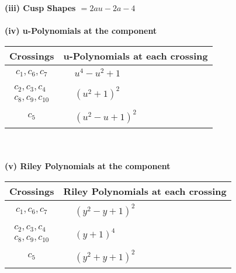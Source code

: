 \documentclass[1p]{elsarticle_modified}
\theoremstyle{definition}
\begin{document}
\flushleft \textbf{(iii) Cusp Shapes $= 2 a u-2 a-4$}\\~\\
\newpage\renewcommand{\arraystretch}{1}
\flushleft \textbf{(iv) u-Polynomials at the component}\newline \\
\begin{tabular}{m{50pt}|m{274pt}}
Crossings & \hspace{64pt}u-Polynomials at each crossing \\
\hline $$\begin{aligned}c_{1},c_{6},c_{7}\end{aligned}$$&$\begin{aligned}
&u^4- u^2+1
\end{aligned}$\\
\hline $$\begin{aligned}c_{2},c_{3},c_{4}\\c_{8},c_{9},c_{10}\end{aligned}$$&$\begin{aligned}
&(u^2+1)^2
\end{aligned}$\\
\hline $$\begin{aligned}c_{5}\end{aligned}$$&$\begin{aligned}
&(u^2- u+1)^2
\end{aligned}$\\
\hline
\end{tabular}\\~\\
\newpage\renewcommand{\arraystretch}{1}
\flushleft \textbf{(v) Riley Polynomials at the component}\newline \\
\begin{tabular}{m{50pt}|m{274pt}}
Crossings & \hspace{64pt}Riley Polynomials at each crossing \\
\hline $$\begin{aligned}c_{1},c_{6},c_{7}\end{aligned}$$&$\begin{aligned}
&(y^2- y+1)^2
\end{aligned}$\\
\hline $$\begin{aligned}c_{2},c_{3},c_{4}\\c_{8},c_{9},c_{10}\end{aligned}$$&$\begin{aligned}
&(y+1)^4
\end{aligned}$\\
\hline $$\begin{aligned}c_{5}\end{aligned}$$&$\begin{aligned}
&(y^2+y+1)^2
\end{aligned}$\\
\hline
\end{tabular}\\~\\
\end{document}
